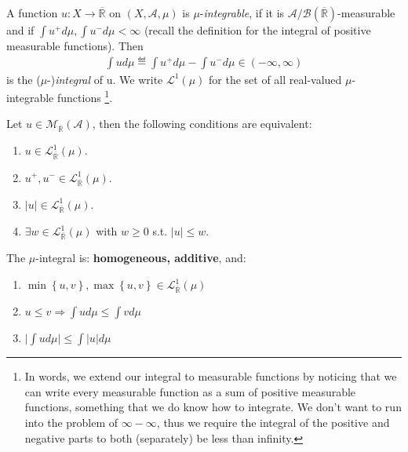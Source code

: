 \begin{definition}[\(\mu\)-integrable]
    A function \(u:X \rightarrow \overline{\mathbb{R}}\) on \((X, \mathscr{A}, \mu)\) is \(\mu\)-\emph{integrable}, if it is 
    \(\mathscr{A}/\mathscr{B}(\overline{\mathbb{R}})\)-measurable and if \(\int u^+ d\mu, \int u^-d\mu < \infty\) (recall the definition
    for the integral of positive measurable functions). Then
    \begin{align*}
        \int ud\mu \eqdef \int u^+d\mu - \int u^-d\mu \in (-\infty, \infty)
    \end{align*}
    is the (\(\mu\)-)\emph{integral} of u. We write \(\mathcal{L}^1(\mu)\) for the set of all real-valued \(\mu\)-integrable functions
    \footnote{In words, we extend our integral to  measurable functions by noticing that we can write every measurable 
    function as a sum of positive measurable functions, something that we do know how to integrate. We don't want to run into the problem
    of \(\infty - \infty\), thus we require the integral of the positive and negative parts to both (separately) be less than infinity.}.
\end{definition}
\begin{theorem}
    Let \(u\in \mathcal{M}_{\overline{\mathbb{R}}}(\mathscr{A})\), then the following conditions are equivalent:
    \begin{enumerate}[label=(\roman*)]
        \item \(u \in \mathcal{L}^{1}_{\overline{\mathbb{R}}}(\mu)\).
        \item \(u^+, u^- \in \mathcal{L}^{1}_{\overline{\mathbb{R}}}(\mu)\).
        \item \(\vert u\vert \in \mathcal{L}^{1}_{\overline{\mathbb{R}}}(\mu)\).
        \item \(\exists w \in \mathcal{L}^{1}_{\overline{\mathbb{R}}}(\mu)\) with \(w\geq 0\) s.t. \(\vert u \vert \leq w\).
    \end{enumerate}
\end{theorem}
\begin{theorem} The \(\mu\)-integral is: \textbf{homogeneous, additive}, and:
    \begin{enumerate}[label=(\roman*)]
        \item \(\min\left\{u,v\right\}, \max\left\{u,v\right\} \in \mathcal{L}^{1}_{\overline{\mathbb{R}}}(\mu)\) 
        \item \(u\leq v \Rightarrow \int ud\mu \leq \int vd\mu\) 
        \item \(\Big\vert \int ud\mu \Big\vert \leq \int \vert u\vert d\mu\) 
    \end{enumerate}
\end{theorem}
